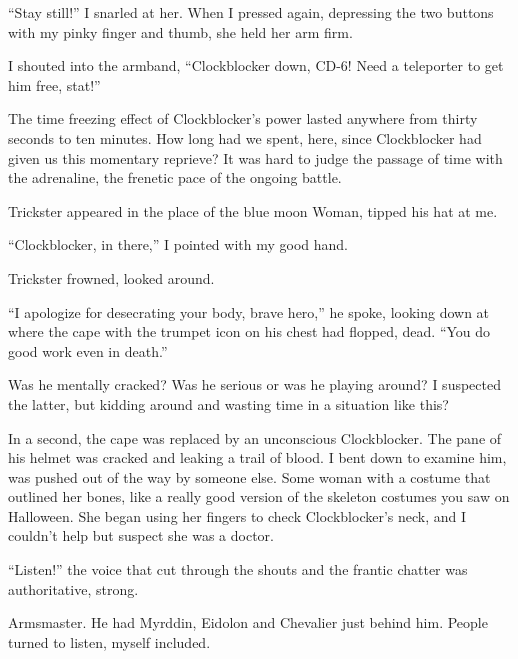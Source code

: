 ``Stay still!'' I snarled at her.  When I pressed again, depressing the two buttons with my pinky finger and thumb, she held her arm firm.



I shouted into the armband, ``Clockblocker down, CD-6!  Need a teleporter to get him free, stat!''



The time freezing effect of Clockblocker's power lasted anywhere from thirty seconds to ten minutes.  How long had we spent, here, since Clockblocker had given us this momentary reprieve?  It was hard to judge the passage of time with the adrenaline, the frenetic pace of the ongoing battle.



Trickster appeared in the place of the blue moon Woman, tipped his hat at me.



``Clockblocker, in there,'' I pointed with my good hand.



Trickster frowned, looked around.



``I apologize for desecrating your body, brave hero,'' he spoke, looking down at where the cape with the trumpet icon on his chest had flopped, dead.  ``You do good work even in death.''



Was he mentally cracked?  Was he serious or was he playing around?  I suspected the latter, but kidding around and wasting time in a situation like this?



In a second, the cape was replaced by an unconscious Clockblocker.  The pane of his helmet was cracked and leaking a trail of blood.  I bent down to examine him, was pushed out of the way by someone else.  Some woman with a costume that outlined her bones, like a really good version of the skeleton costumes you saw on Halloween.  She began using her fingers to check Clockblocker's neck, and I couldn't help but suspect she was a doctor.



``Listen!'' the voice that cut through the shouts and the frantic chatter was authoritative, strong.



Armsmaster.  He had Myrddin, Eidolon and Chevalier just behind him.  People turned to listen, myself included.



